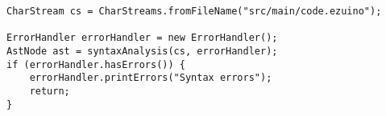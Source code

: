 \begin{lstlisting}[caption={Start of main}, label={eh02}]
CharStream cs = CharStreams.fromFileName("src/main/code.ezuino");

ErrorHandler errorHandler = new ErrorHandler();
AstNode ast = syntaxAnalysis(cs, errorHandler);
if (errorHandler.hasErrors()) {
    errorHandler.printErrors("Syntax errors");
    return;
}
\end{lstlisting}